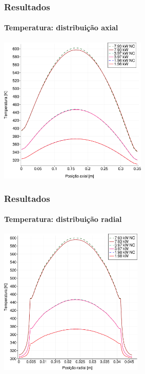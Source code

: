 \documentclass[svgnames,smaller,table]{beamer}
\begin{document}
\begin{frame}
  \frametitle{Resultados}
  \framesubtitle{Temperatura: distribuição axial}
  \centering\includegraphics[width=\textwidth, height=7.0cm]{../figuras/T_z_all_square_port.png}
  \label{fig:keff50}
\end{frame}

\begin{frame}
  \frametitle{Resultados}
  \framesubtitle{Temperatura: distribuição radial}
  \centering\includegraphics[width=\textwidth, height=7.0cm]{../figuras/T_x_all_square_port.png}
  \label{fig:keff50}
\end{frame}
\end{document}
